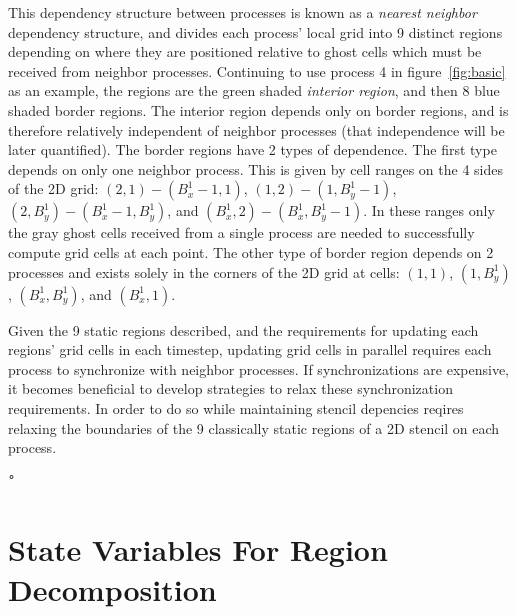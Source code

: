 This dependency structure between processes is known as a {\it nearest neighbor} dependency structure, and divides
each process' local grid into 9 distinct regions depending on where they are positioned relative
 to ghost cells which
must be received from neighbor processes.  Continuing to use process 4
in figure~\ref{fig:basic} as an example, the
regions are the green
shaded {\it interior region}, and then 8 blue shaded border regions.  The interior region depends only on border
regions, and is therefore relatively independent of neighbor processes (that independence will be later quantified).
The border regions have 2 types of dependence.  The first type depends on only one neighbor process.  This is
given by cell ranges on the 4 sides of the 2D grid: $(2,1) - (B_x^1 - 1, 1)$, $(1,2) - (1,B_y^1 - 1)$,
$(2,B_y^1) - (B_x^1 - 1, B_y^1)$, and $(B_x^1,2) - (B_x^1,B_y^1 - 1)$.  In these ranges only the gray ghost cells
 received from a single process are
needed to successfully compute grid cells at each point.  The other type of border region depends on 2 processes and exists solely
in the corners of the 2D grid at cells: $(1,1)$, $(1,B_y^1)$, $(B_x^1,B_y^1)$, and $(B_x^1,1)$.

Given the 9 static regions described, and the requirements for updating each regions' grid cells in each
timestep, updating grid cells in parallel requires each process to synchronize with neighbor
processes.
If synchronizations are expensive, it becomes beneficial
to develop strategies to relax these synchronization requirements.  In order to do so while maintaining
stencil depencies reqires relaxing the boundaries of the 9 classically static regions of a 2D stencil
on each process.

ْ

\section{State Variables For Region Decomposition}\label{sec:state}

